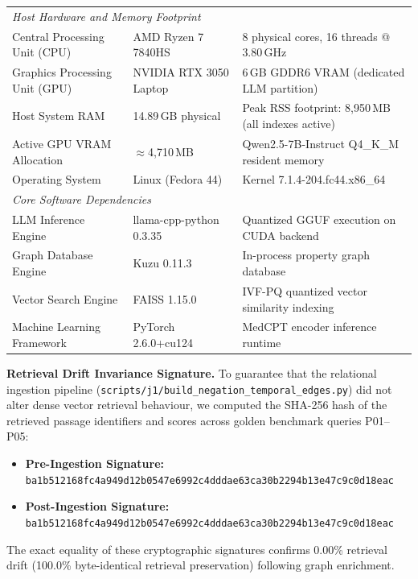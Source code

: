 \documentclass[preprint,12pt,a4paper]{elsarticle}
\begin{document}
{\begin{tabular}{lll}
\midrule
\multicolumn{3}{l}{\emph{Host Hardware and Memory Footprint}} \\
Central Processing Unit (CPU) & AMD Ryzen 7 7840HS & 8 physical cores, 16 threads @ 3.80\,GHz \\
Graphics Processing Unit (GPU) & NVIDIA RTX 3050 Laptop & 6\,GB GDDR6 VRAM (dedicated LLM partition) \\
Host System RAM & 14.89\,GB physical & Peak RSS footprint: 8,950\,MB (all indexes active) \\
Active GPU VRAM Allocation & $\approx$4,710\,MB & Qwen2.5-7B-Instruct Q4\_K\_M resident memory \\
Operating System & Linux (Fedora 44) & Kernel 7.1.4-204.fc44.x86\_64 \\
\midrule
\multicolumn{3}{l}{\emph{Core Software Dependencies}} \\
LLM Inference Engine & llama-cpp-python 0.3.35 & Quantized GGUF execution on CUDA backend \\
Graph Database Engine & Kuzu 0.11.3 & In-process property graph database \\
Vector Search Engine & FAISS 1.15.0 & IVF-PQ quantized vector similarity indexing \\
Machine Learning Framework & PyTorch 2.6.0+cu124 & MedCPT encoder inference runtime \\
\bottomrule
\end{tabular}%
}%
\par
\endgroup

\vspace{0.4cm}
\noindent\textbf{Retrieval Drift Invariance Signature.}
To guarantee that the relational ingestion pipeline (\texttt{scripts/j1/build\_negation\_temporal\_edges.py})
did not alter dense vector retrieval behaviour, we computed the SHA-256 hash of the
retrieved passage identifiers and scores across golden benchmark queries P01--P05:
\begin{itemize}
  \item \textbf{Pre-Ingestion Signature:}\\
        {\footnotesize\texttt{ba1b512168fc4a949d12b0547e6992c4dddae63ca30b2294b13e47c9c0d18eac}}
  \item \textbf{Post-Ingestion Signature:}\\
        {\footnotesize\texttt{ba1b512168fc4a949d12b0547e6992c4dddae63ca30b2294b13e47c9c0d18eac}}
\end{itemize}
The exact equality of these cryptographic signatures confirms 0.00\% retrieval drift
(100.0\% byte-identical retrieval preservation) following graph enrichment.
\end{document}
